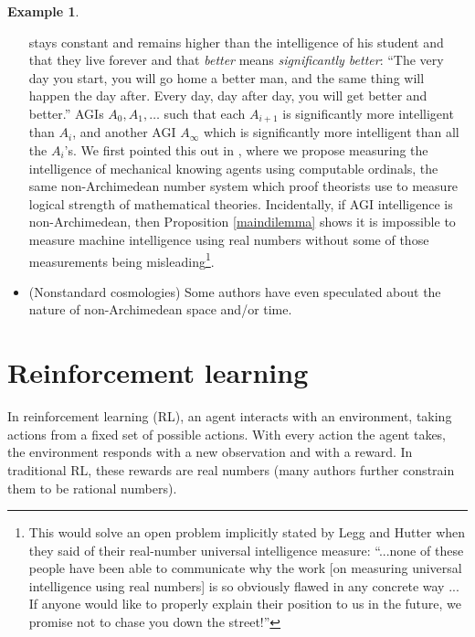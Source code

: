 \documentclass[reqno]{article}
\theoremstyle{definition}
\newtheorem{example}[theorem]{Example}
\begin{document}
\begin{example}
\begin{itemize}
{        stays constant and remains higher than the intelligence of his student
        and that they live forever and that \emph{better} means \emph{significantly
        better}:
        ``The very day you start, you will go home a better man, and the same thing
        will happen the day after. Every day, day after day, you will get better
        and better.'' \cite{protagoras}} AGIs $A_0,A_1,\ldots$ such that
        each $A_{i+1}$ is significantly more
        intelligent than $A_i$, and another AGI $A_\infty$ which is significantly more
        intelligent than all the $A_i$'s. We first pointed this out in
        \cite{alexander2019measuring}, where we propose measuring the
        intelligence of mechanical
        knowing agents using computable ordinals, the same non-Archimedean number system
        which proof theorists use to measure logical strength of mathematical
        theories. Incidentally, if AGI intelligence is non-Archimedean, then
        Proposition \ref{maindilemma} shows it is
        impossible to measure machine intelligence using real numbers without some
        of those measurements being misleading\footnote{This would solve an open problem
        implicitly stated by Legg and Hutter \cite{legg} when they said of their
        real-number universal intelligence measure: ``...none of these people have
        been able to communicate why the work [on measuring universal intelligence
        using real numbers] is so obviously flawed in any concrete way ...
        If anyone would like to properly explain their position to us in the future,
        we promise not to chase you down the street!''}.
        \item
        (Nonstandard cosmologies)
        Some
        authors
        \cite{al2016surreal} \cite{andreka2012logic}
        \cite{reeder2012infinitesimals} \cite{rosinger2007cosmic}
        \cite{chen2019infinitesimal} have
        even speculated about the nature of non-Archimedean space and/or
        time.
    \end{itemize}
\end{example}


\section{Reinforcement learning}
\label{reinforcementlearningsection}

In reinforcement learning (RL), an agent interacts with an environment,
taking actions from a fixed set of possible actions. With every action the
agent takes, the environment responds with a new observation and with a
reward. In traditional RL, these rewards are real numbers (many
authors further constrain them to be rational numbers).
\end{document}
